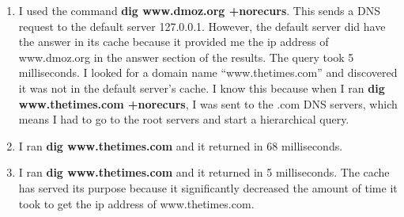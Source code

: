 \documentclass[psamsfonts]{amsart}
\begin{document}
\begin{enumerate}
  \item I used the command \textbf{dig www.dmoz.org +norecurs}. This sends a DNS request to the default server 127.0.0.1. However, the default server did have the answer in its cache because it provided me the ip address of www.dmoz.org in the answer section of the results. The query took 5 milliseconds. I looked for a domain name ``www.thetimes.com'' and discovered it was not in the default server's cache. I know this because when I ran \textbf{dig www.thetimes.com +norecurs}, I was sent to the .com DNS servers, which means I had to go to the root servers and start a hierarchical query.
  \item I ran \textbf{dig www.thetimes.com} and it returned in 68 milliseconds.
  \item I ran \textbf{dig www.thetimes.com} and it returned in 5 milliseconds. The cache has served its purpose because it significantly decreased the amount of time it took to get the ip address of www.thetimes.com.
\end{enumerate}
\end{document}
